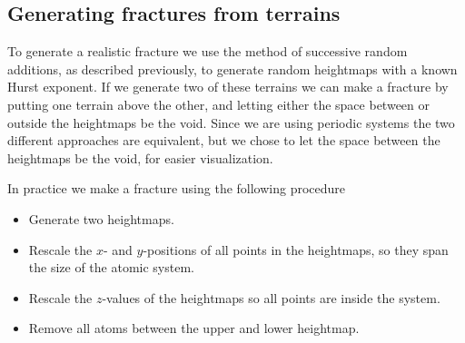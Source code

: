 %     

% 
% 
% 

\subsection{Generating fractures from terrains}
To generate a realistic fracture we use the method of successive random additions, as described previously, to generate random heightmaps with a known Hurst exponent. If we generate two of these terrains we can make a fracture by putting one terrain above the other, and letting either the space between or outside the heightmaps be the void. Since we are using periodic systems the two different approaches are equivalent, but we chose to let the space between the heightmaps be the void, for easier visualization.

In practice we make a fracture using the following procedure
\begin{itemize}
    \item Generate two heightmaps.
    \item Rescale the $x$- and $y$-positions of all points in the heightmaps, so they span the size of the atomic system.
    \item Rescale the $z$-values of the heightmaps so all points are inside the system.
    \item Remove all atoms between the upper and lower heightmap.
\end{itemize}

